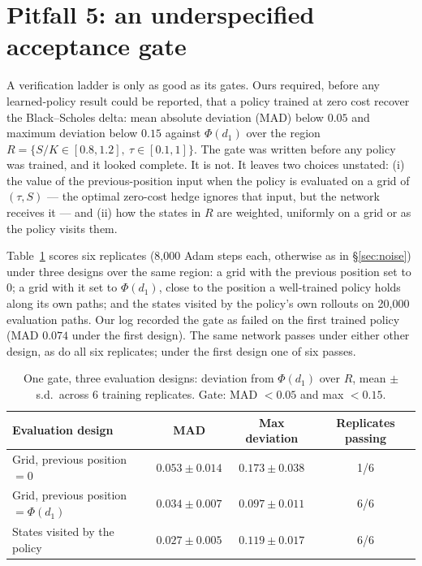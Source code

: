 \documentclass{article}
\begin{document}
\section{Pitfall 5: an underspecified acceptance gate}\label{sec:gate}

A verification ladder is only as good as its gates. Ours required, before any learned-policy
result could be reported, that a policy trained at zero cost recover the Black--Scholes delta:
mean absolute deviation (MAD) below $0.05$ and maximum deviation below $0.15$ against
$\Phi(d_1)$ over the region $R = \{S/K \in [0.8, 1.2],\ \tau \in [0.1, 1]\}$. The gate was
written before any policy was trained, and it looked complete. It is not. It leaves two choices
unstated: (i) the value of the previous-position input when the policy is evaluated on a grid of
$(\tau, S)$ --- the optimal zero-cost hedge ignores that input, but the network receives it --- and
(ii) how the states in $R$ are weighted, uniformly on a grid or as the policy visits them.

Table~\ref{tab:gate} scores six replicates (8{,}000 Adam steps each, otherwise as in
\S\ref{sec:noise}) under three designs over the same region: a grid with the previous position
set to 0; a grid with it set to $\Phi(d_1)$, close to the position a well-trained policy holds
along its own paths; and the states visited by the policy's own rollouts on 20{,}000 evaluation
paths. Our log recorded the gate
as failed on the first trained policy (MAD $0.074$ under the first design). The same network
passes under either other design, as do all six replicates; under the first design one of six
passes.

\begin{table}[t]
  \caption{One gate, three evaluation designs: deviation from $\Phi(d_1)$ over $R$, mean $\pm$
    s.d.\ across 6 training replicates. Gate: MAD $< 0.05$ and max $< 0.15$.}
  \label{tab:gate}
  \centering
  \small
  \begin{tabular}{lccc}
    \toprule
    Evaluation design & MAD & Max deviation & Replicates passing \\
    \midrule
    Grid, previous position $= 0$           & $0.053 \pm 0.014$ & $0.173 \pm 0.038$ & 1/6 \\
    Grid, previous position $= \Phi(d_1)$   & $0.034 \pm 0.007$ & $0.097 \pm 0.011$ & 6/6 \\
    States visited by the policy            & $0.027 \pm 0.005$ & $0.119 \pm 0.017$ & 6/6 \\
    \bottomrule
  \end{tabular}
\end{table}
\end{document}
